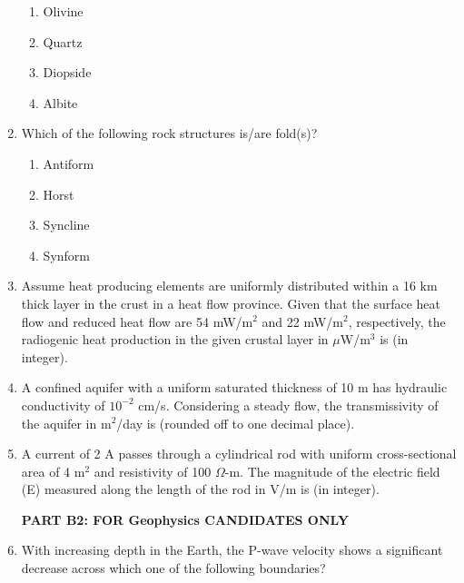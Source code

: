 \documentclass[journal,12pt,onecolumn]{IEEEtran}
\begin{document}
\begin{enumerate}
\hfill{}

\begin{multicols}{2}
\begin{enumerate}
\item Olivine
\item Quartz
\item Diopside
\item Albite
\end{enumerate}
\end{multicols}

\item Which of the following rock structures is/are fold(s)?  

\hfill{}

\begin{multicols}{2}
\begin{enumerate}
\item Antiform
\item Horst
\item Syncline
\item Synform
\end{enumerate}
\end{multicols}

\item Assume heat producing elements are uniformly distributed within a 16 km thick layer in the crust in a heat flow province. Given that the surface heat flow and reduced heat flow are 54 mW/m$^2$ and 22 mW/m$^2$, respectively, the radiogenic heat production in the given crustal layer in $\mu$W/m$^3$ is  (in integer).  

\hfill{}

\item A confined aquifer with a uniform saturated thickness of 10 m has hydraulic conductivity of $10^{-2}$ cm/s. Considering a steady flow, the transmissivity of the aquifer in m$^2$/day is  (rounded off to one decimal place).  

\hfill{}

\item A current of 2 A passes through a cylindrical rod with uniform cross-sectional area of 4 m$^2$ and resistivity of 100 $\Omega$-m. The magnitude of the electric field (E) measured along the length of the rod in V/m is  (in integer).  


\textbf{PART B2: FOR Geophysics CANDIDATES ONLY}


\item With increasing depth in the Earth, the P-wave velocity shows a significant decrease across which one of the following boundaries?  


\end{enumerate}
\end{document}
